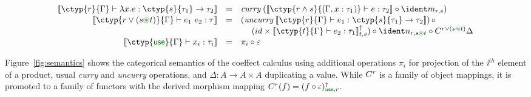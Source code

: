 \begin{figure*}[t]
\vspace{-1em}
\newcommand{\uu}[1]{\overline{#1}}
\begin{equation*}
\begin{array}{rcll}
\cosem{\ctyp{r}{\Gamma} \vdash \lambda x.e : \ctyp{s}{\tau_1} \rightarrow \tau_2} &=& 
    \emph{curry} \; (\cosem{\ctyp{r \wedge s}{(\Gamma, x:\tau_1)} \vdash e : \tau_2} \circ \cmerge_{r, s})    %
\\[0.1em]
\cosem{\ctyp{r \vee (s \cseq t)}{\Gamma} \vdash e_1~e_2 : \tau} &=& 
    (\emph{uncurry} \;  \cosem{\ctyp{r}{\Gamma} \vdash e_1 : \ctyp{s}{\tau_1} \rightarrow \tau_2}) \, \circ \\
 & & \quad\; (id \times \cobind{\cosem{\ctyp{t}{\Gamma}\vdash e_2 : \tau_1}}{t,s})
    \circ \csplit_{r, s \cseq t} \circ \iftor{r \vee (s \cseq t)}\Delta
\\[0.1em]
\cosem{\ctyp{\cunit}{\Gamma} \vdash x_i : \tau_i} &=&
    \pi_i \circ \counit                                                                  %
\end{array}
\end{equation*}
\vspace{-1.5em}
\caption{Categorical semantics for the coeffect calculus}
\label{fig:semantics}
\vspace{-1.0em}
\end{figure*}

Figure~\ref{fig:semantics} shows the
categorical semantics of the coeffect calculus
using additional operations 
$\pi_i$ for projection of the \emph{i}$^{th}$ element of a 
product, usual
\emph{curry} and \emph{uncurry} operations, and
 $\Delta : A \rightarrow A \times A$ duplicating a
value. While $C^{r}$ is a family of object mappings,
it is promoted to a family of functors with the derived morphism mapping 
$\iftor{r}(f) = \cobind{ (f \circ \counit) }{\cunit, r}$.

